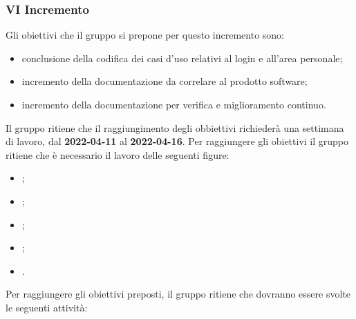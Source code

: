 \subsubsection{VI Incremento}
Gli obiettivi che il gruppo si prepone per questo incremento sono:
\begin{itemize}
	\item conclusione della codifica dei casi d'uso relativi al login e all'area personale;
 	\item incremento della documentazione da correlare al prodotto software;
	\item incremento della documentazione per verifica e miglioramento continuo.
\end{itemize}
Il gruppo ritiene che il raggiungimento degli obbiettivi richiederà una settimana di lavoro, dal \textbf{2022-04-11} al \textbf{2022-04-16}.
Per raggiungere gli obiettivi il gruppo ritiene che è necessario il lavoro delle seguenti figure:
\begin{itemize}
	\item \RE{};
 	\item \AM{};
   	\item \PT{};
    \item \PR{};
   	\item \VE{}.
\end{itemize}
Per raggiungere gli obiettivi preposti, il gruppo ritiene che dovranno essere svolte le seguenti attività:
